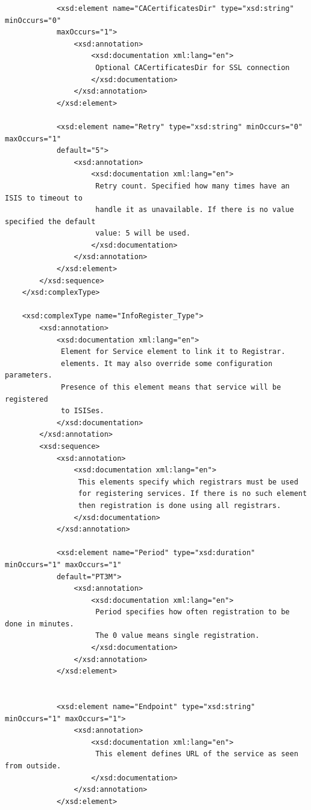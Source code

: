 \documentclass{book}
\begin{document}
\begin{verbatim}
            <xsd:element name="CACertificatesDir" type="xsd:string"  minOccurs="0" 
            maxOccurs="1">
                <xsd:annotation>
                    <xsd:documentation xml:lang="en">
                     Optional CACertificatesDir for SSL connection
                    </xsd:documentation>
                </xsd:annotation>
            </xsd:element>

            <xsd:element name="Retry" type="xsd:string" minOccurs="0" maxOccurs="1" 
            default="5">
                <xsd:annotation>
                    <xsd:documentation xml:lang="en">
                     Retry count. Specified how many times have an ISIS to timeout to
                     handle it as unavailable. If there is no value specified the default
                     value: 5 will be used.
                    </xsd:documentation>
                </xsd:annotation>
            </xsd:element>
        </xsd:sequence>
    </xsd:complexType>

    <xsd:complexType name="InfoRegister_Type">
        <xsd:annotation>
            <xsd:documentation xml:lang="en">
             Element for Service element to link it to Registrar.
             elements. It may also override some configuration parameters.
             Presence of this element means that service will be registered
             to ISISes.
            </xsd:documentation>
        </xsd:annotation>
        <xsd:sequence>
            <xsd:annotation>
                <xsd:documentation xml:lang="en">
                 This elements specify which registrars must be used
                 for registering services. If there is no such element
                 then registration is done using all registrars.
                </xsd:documentation>
            </xsd:annotation>

            <xsd:element name="Period" type="xsd:duration" minOccurs="1" maxOccurs="1" 
            default="PT3M">
                <xsd:annotation>
                    <xsd:documentation xml:lang="en">
                     Period specifies how often registration to be done in minutes.
                     The 0 value means single registration.
                    </xsd:documentation>
                </xsd:annotation>
            </xsd:element>


            <xsd:element name="Endpoint" type="xsd:string" minOccurs="1" maxOccurs="1">
                <xsd:annotation>
                    <xsd:documentation xml:lang="en">
                     This element defines URL of the service as seen from outside.
                    </xsd:documentation>
                </xsd:annotation>
            </xsd:element>


\end{verbatim}
\end{document}
